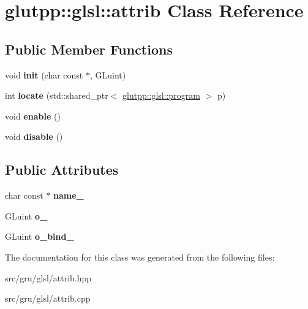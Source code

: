 \hypertarget{classglutpp_1_1glsl_1_1attrib}{\section{glutpp\-:\-:glsl\-:\-:attrib \-Class \-Reference}
\label{classglutpp_1_1glsl_1_1attrib}
}
\subsection*{\-Public \-Member \-Functions}
\begin{DoxyCompactItemize}
\item 
\hypertarget{classglutpp_1_1glsl_1_1attrib_ad6cd70902fcafda280444fa1aed5d7f9}{void {\bfseries init} (char const $\ast$, \-G\-Luint)}\label{classglutpp_1_1glsl_1_1attrib_ad6cd70902fcafda280444fa1aed5d7f9}

\item 
\hypertarget{classglutpp_1_1glsl_1_1attrib_adf090262039d4ec3c02bedf95f749cb8}{int {\bfseries locate} (std\-::shared\-\_\-ptr$<$ \hyperlink{classglutpp_1_1glsl_1_1program}{glutpp\-::glsl\-::program} $>$ p)}\label{classglutpp_1_1glsl_1_1attrib_adf090262039d4ec3c02bedf95f749cb8}

\item 
\hypertarget{classglutpp_1_1glsl_1_1attrib_a787f4a60c290234fd0f6dc3b17df090c}{void {\bfseries enable} ()}\label{classglutpp_1_1glsl_1_1attrib_a787f4a60c290234fd0f6dc3b17df090c}

\item 
\hypertarget{classglutpp_1_1glsl_1_1attrib_a01fc89c183e17a5878e5bfc0ccc613c9}{void {\bfseries disable} ()}\label{classglutpp_1_1glsl_1_1attrib_a01fc89c183e17a5878e5bfc0ccc613c9}

\end{DoxyCompactItemize}
\subsection*{\-Public \-Attributes}
\begin{DoxyCompactItemize}
\item 
\hypertarget{classglutpp_1_1glsl_1_1attrib_af8ab9f06c05904695042afaa75d610e1}{char const $\ast$ {\bfseries name\-\_\-}}\label{classglutpp_1_1glsl_1_1attrib_af8ab9f06c05904695042afaa75d610e1}

\item 
\hypertarget{classglutpp_1_1glsl_1_1attrib_aafb165178e04753d569922c62213f34d}{\-G\-Luint {\bfseries o\-\_\-}}\label{classglutpp_1_1glsl_1_1attrib_aafb165178e04753d569922c62213f34d}

\item 
\hypertarget{classglutpp_1_1glsl_1_1attrib_a6dfc7a7358faaee15f8cb2d40130f693}{\-G\-Luint {\bfseries o\-\_\-bind\-\_\-}}\label{classglutpp_1_1glsl_1_1attrib_a6dfc7a7358faaee15f8cb2d40130f693}

\end{DoxyCompactItemize}


\-The documentation for this class was generated from the following files\-:\begin{DoxyCompactItemize}
\item 
src/gru/glsl/attrib.\-hpp\item 
src/gru/glsl/attrib.\-cpp\end{DoxyCompactItemize}
